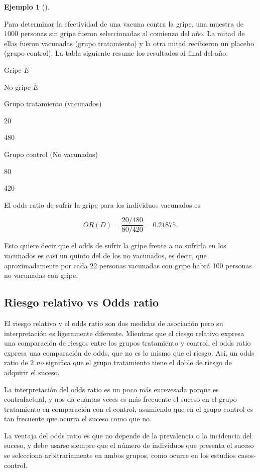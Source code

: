 \documentclass[
  spanish,
  a4paper,
]{scrreport}
\theoremstyle{plain}
\theoremstyle{definition}
\newtheorem{example}{Ejemplo}[chapter]
\theoremstyle{definition}
\theoremstyle{remark}
\begin{document}
\begin{example}[]\protect\hypertarget{exm-odds-ratio}{}\label{exm-odds-ratio}

Para determinar la efectividad de una vacuna contra la gripe, una
muestra de 1000 personas sin gripe fueron seleccionadas al comienzo del
año. La mitad de ellas fueron vacunadas (grupo tratamiento) y la otra
mitad recibieron un placebo (grupo control). La tabla siguiente resume
los resultados al final del año.

Gripe \(E\)

No gripe \(\overline E\)

Grupo tratamiento (vacunados)

20

480

Grupo control (No vacunados)

80

420

El odds ratio de sufrir la gripe para los individuos vacunados es

\[OR(D) = \frac{20/480}{80/420} = 0.21875.\]

Esto quiere decir que el odds de sufrir la gripe frente a no sufrirla en
los vacunados es casi un quinto del de los no vacunados, es decir, que
aproximadamente por cada 22 personas vacunadas con gripe habrá 100
personas no vacunadas con gripe.

\end{example}

\subsection{Riesgo relativo vs Odds
ratio}\label{riesgo-relativo-vs-odds-ratio}

El riesgo relativo y el odds ratio son dos medidas de asociación pero su
interpretación es ligeramente diferente. Mientras que el riesgo relativo
expresa una comparación de riesgos entre los grupos tratamiento y
control, el odds ratio expresa una comparación de odds, que no es lo
mismo que el riesgo. Así, un odds ratio de 2 \emph{no} significa que el
grupo tratamiento tiene el doble de riesgo de adquirir el suceso.

La interpretación del odds ratio es un poco más enrevesada porque es
contrafactual, y nos da cuántas veces es más frecuente el suceso en el
grupo tratamiento en comparación con el control, asumiendo que en el
grupo control es tan frecuente que ocurra el suceso como que no.

La ventaja del odds ratio es que no depende de la prevalencia o la
incidencia del suceso, y debe usarse siempre que el número de individuos
que presenta el suceso se selecciona arbitrariamente en ambos grupos,
como ocurre en los estudios casos-control.
\end{document}
